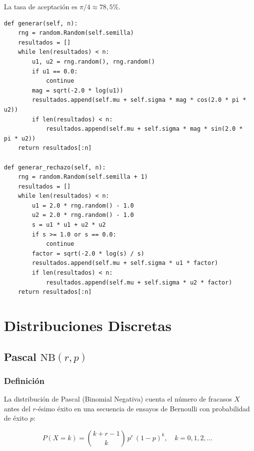 \documentclass[a4paper, 11pt]{article}
\begin{document}
La tasa de aceptación es $\pi/4 \approx 78{,}5\%$.

\begin{lstlisting}[style=python, caption={Generador Normal — Box-Muller y método polar.}]
def generar(self, n):
    rng = random.Random(self.semilla)
    resultados = []
    while len(resultados) < n:
        u1, u2 = rng.random(), rng.random()
        if u1 == 0.0:
            continue
        mag = sqrt(-2.0 * log(u1))
        resultados.append(self.mu + self.sigma * mag * cos(2.0 * pi * u2))
        if len(resultados) < n:
            resultados.append(self.mu + self.sigma * mag * sin(2.0 * pi * u2))
    return resultados[:n]

def generar_rechazo(self, n):
    rng = random.Random(self.semilla + 1)
    resultados = []
    while len(resultados) < n:
        u1 = 2.0 * rng.random() - 1.0
        u2 = 2.0 * rng.random() - 1.0
        s = u1 * u1 + u2 * u2
        if s >= 1.0 or s == 0.0:
            continue
        factor = sqrt(-2.0 * log(s) / s)
        resultados.append(self.mu + self.sigma * u1 * factor)
        if len(resultados) < n:
            resultados.append(self.mu + self.sigma * u2 * factor)
    return resultados[:n]
\end{lstlisting}


\section{Distribuciones Discretas}

\subsection{Pascal \texorpdfstring{$\mathrm{NB}(r, p)$}{NB(r,p)}}

\subsubsection*{Definición}

La distribución de Pascal (Binomial Negativa) cuenta el número de fracasos $X$
antes del $r$-ésimo éxito en una secuencia de ensayos de Bernoulli con
probabilidad de éxito $p$:

\begin{equation}
  P(X = k) = \binom{k + r - 1}{k}\,p^r\,(1-p)^k, \quad k = 0,1,2,\ldots
  \label{eq:pascal_pmf}
\end{equation}
\end{document}

